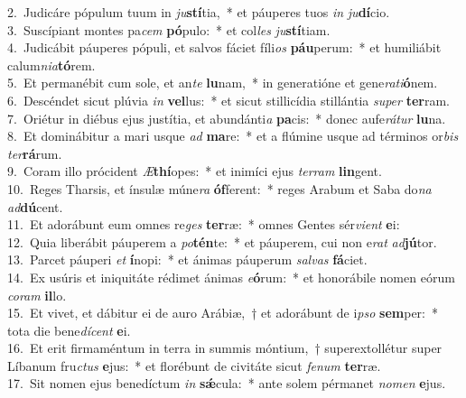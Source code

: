 {2.~}Judicáre pópulum tuum in \textit{ju}\textbf{stí}tia,~* et páuperes tuos \textit{in} \textit{ju}\textbf{dí}cio.\\
{3.~}Suscípiant montes pa\textit{cem} \textbf{pó}pulo:~* et col\textit{les} \textit{ju}\textbf{stí}tiam.\\
{4.~}Judicábit páuperes pópuli, et salvos fáciet fíli\textit{os} \textbf{páu}perum:~* et humiliábit calum\textit{ni}\textit{a}\textbf{tó}rem.\\
{5.~}Et permanébit cum sole, et an\textit{te} \textbf{lu}nam,~* in generatióne et gene\textit{ra}\textit{ti}\textbf{ó}nem.\\
{6.~}Descéndet sicut plúvia \textit{in} \textbf{vel}lus:~* et sicut stillicídia stillántia \textit{su}\textit{per} \textbf{ter}ram.\\
{7.~}Oriétur in diébus ejus justítia, et abundánti\textit{a} \textbf{pa}cis:~* donec aufe\textit{rá}\textit{tur} \textbf{lu}na.\\
{8.~}Et dominábitur a mari usque \textit{ad} \textbf{ma}re:~* et a flúmine usque ad términos or\textit{bis} \textit{ter}\textbf{rá}rum.\\
{9.~}Coram illo prócident \textit{Æ}\textbf{thí}opes:~* et inimíci ejus \textit{ter}\textit{ram} \textbf{lin}gent.\\
{10.~}Reges Tharsis, et ínsulæ múne\textit{ra} \textbf{óf}ferent:~* reges Arabum et Saba do\textit{na} \textit{ad}\textbf{dú}cent.\\
{11.~}Et adorábunt eum omnes re\textit{ges} \textbf{ter}ræ:~* omnes Gentes sér\textit{vi}\textit{ent} \textbf{e}i:\\
{12.~}Quia liberábit páuperem a \textit{po}\textbf{tén}te:~* et páuperem, cui non e\textit{rat} \textit{ad}\textbf{jú}tor.\\
{13.~}Parcet páuperi \textit{et} \textbf{í}nopi:~* et ánimas páuperum \textit{sal}\textit{vas} \textbf{fá}ciet.\\
{14.~}Ex usúris et iniquitáte rédimet ánimas \textit{e}\textbf{ó}rum:~* et honorábile nomen eórum \textit{co}\textit{ram} \textbf{il}lo.\\
{15.~}Et vivet, et dábitur ei de auro Arábiæ,~† et adorábunt de i\textit{pso} \textbf{sem}per:~* tota die bene\textit{dí}\textit{cent} \textbf{e}i.\\
{16.~}Et erit firmaméntum in terra in summis móntium,~† superextollétur super Líbanum fru\textit{ctus} \textbf{e}jus:~* et florébunt de civitáte sicut \textit{fe}\textit{num} \textbf{ter}ræ.\\
{17.~}Sit nomen ejus benedíctum \textit{in} \textbf{sǽ}cula:~* ante solem pérmanet \textit{no}\textit{men} \textbf{e}jus.\\

